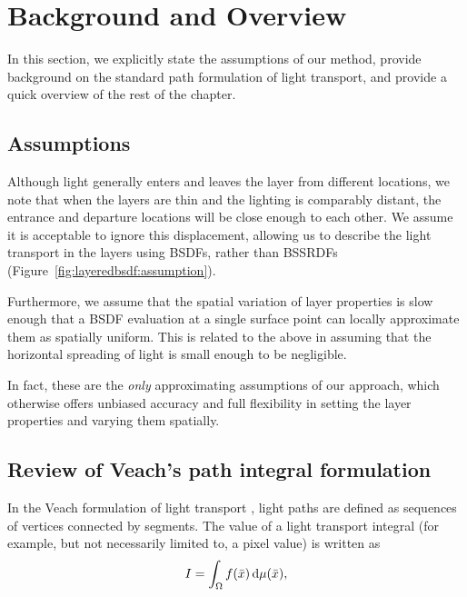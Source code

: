 \section{Background and Overview}
\label{sec:layeredbsdf:background}

In this section, we explicitly state the assumptions of our method, provide background on the standard path formulation of light transport, and provide a quick overview of the rest of the chapter.

\subsection{Assumptions}
Although light generally enters and leaves the layer from different locations, we note that when the layers are thin and the lighting is comparably distant, the entrance and departure locations will be close enough to each other. We assume it is acceptable to ignore this displacement, allowing us to describe the light transport in the layers using BSDFs, rather than BSSRDFs (Figure~\ref{fig:layeredbsdf:assumption}).



Furthermore, we assume that the spatial variation of layer properties is slow enough that a BSDF evaluation at a single surface point can locally approximate them as spatially uniform. This is related to the above in assuming that the horizontal spreading of light is small enough to be negligible.

In fact, these are the \emph{only} approximating assumptions of our approach, which otherwise offers unbiased accuracy and full flexibility in setting the layer properties and varying them spatially.

\subsection{Review of Veach's path integral formulation}
\label{subsec:path_int}

In the Veach formulation of light transport \cite{veach1997robust}, light paths are defined as sequences of vertices connected by segments.
The value of a light transport integral (for example, but not necessarily limited to, a pixel value) is written as
\begin{equation}
	I = \int_\Omega f(\bar x) \,\mathrm{d} \mu(\bar x),
\end{equation}


